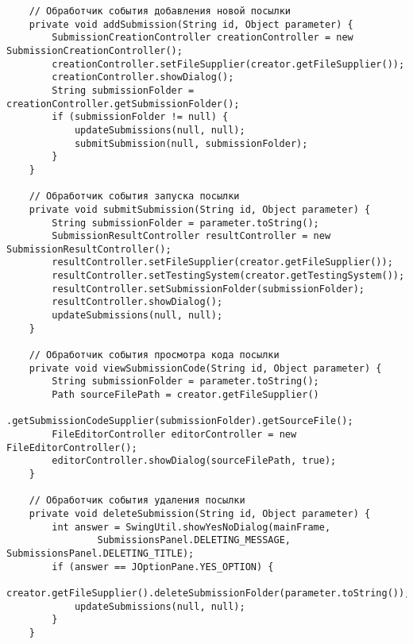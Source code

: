 \begin{verbatim}
    // Обработчик события добавления новой посылки
    private void addSubmission(String id, Object parameter) {
        SubmissionCreationController creationController = new SubmissionCreationController();
        creationController.setFileSupplier(creator.getFileSupplier());
        creationController.showDialog();
        String submissionFolder = creationController.getSubmissionFolder();
        if (submissionFolder != null) {
            updateSubmissions(null, null);
            submitSubmission(null, submissionFolder);
        }
    }
    
    // Обработчик события запуска посылки
    private void submitSubmission(String id, Object parameter) {
        String submissionFolder = parameter.toString();
        SubmissionResultController resultController = new SubmissionResultController();
        resultController.setFileSupplier(creator.getFileSupplier());
        resultController.setTestingSystem(creator.getTestingSystem());
        resultController.setSubmissionFolder(submissionFolder);
        resultController.showDialog();
        updateSubmissions(null, null);
    }
    
    // Обработчик события просмотра кода посылки
    private void viewSubmissionCode(String id, Object parameter) {
        String submissionFolder = parameter.toString();
        Path sourceFilePath = creator.getFileSupplier()
                .getSubmissionCodeSupplier(submissionFolder).getSourceFile();
        FileEditorController editorController = new FileEditorController();
        editorController.showDialog(sourceFilePath, true);
    }
    
    // Обработчик события удаления посылки
    private void deleteSubmission(String id, Object parameter) {
        int answer = SwingUtil.showYesNoDialog(mainFrame,
                SubmissionsPanel.DELETING_MESSAGE, SubmissionsPanel.DELETING_TITLE);
        if (answer == JOptionPane.YES_OPTION) {
            creator.getFileSupplier().deleteSubmissionFolder(parameter.toString());
            updateSubmissions(null, null);
        }
    }
    

\end{verbatim}
